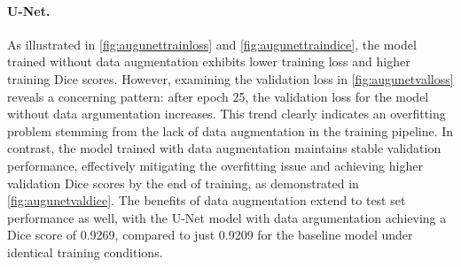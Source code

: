 \documentclass[twocolumn,a4paper]{article}
\begin{document}
\paragraph{U-Net.}
As illustrated in \autoref{fig:augunettrainloss} and \autoref{fig:augunettraindice}, the model trained without data augmentation exhibits lower training loss and higher training Dice scores. However, examining the validation loss in \autoref{fig:augunetvalloss} reveals a concerning pattern: after epoch 25, the validation loss for the model without data argumentation increases. This trend clearly indicates an overfitting problem stemming from the lack of data augmentation in the training pipeline. In contrast, the model trained with data augmentation maintains stable validation performance, effectively mitigating the overfitting issue and achieving higher validation Dice scores by the end of training, as demonstrated in \autoref{fig:augunetvaldice}. The benefits of data augmentation extend to test set performance as well, with the U-Net model with data argumentation achieving a Dice score of 0.9269, compared to just 0.9209 for the baseline model under identical training conditions.
\end{document}
